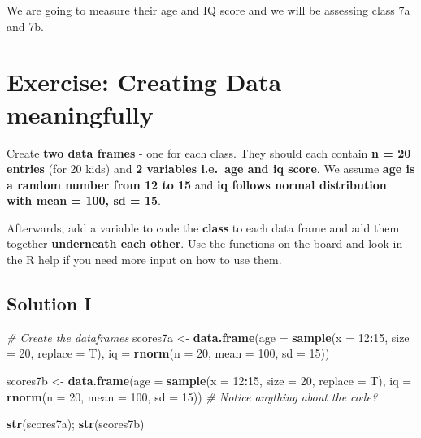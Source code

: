 \documentclass[
]{book}
\newenvironment{Shaded}{\begin{snugshade}}{\end{snugshade}}
\newcommand{\AttributeTok}[1]{\textcolor[rgb]{0.13,0.29,0.53}{#1}}
\newcommand{\CommentTok}[1]{\textcolor[rgb]{0.56,0.35,0.01}{\textit{#1}}}
\newcommand{\DecValTok}[1]{\textcolor[rgb]{0.00,0.00,0.81}{#1}}
\newcommand{\FunctionTok}[1]{\textcolor[rgb]{0.13,0.29,0.53}{\textbf{#1}}}
\newcommand{\NormalTok}[1]{#1}
\newcommand{\OtherTok}[1]{\textcolor[rgb]{0.56,0.35,0.01}{#1}}
\newcommand{\SpecialCharTok}[1]{\textcolor[rgb]{0.81,0.36,0.00}{\textbf{#1}}}
\begin{document}
We are going to measure their age and IQ score and we will be assessing class 7a and 7b.

\section{Exercise: Creating Data meaningfully}\label{exercise-creating-data-meaningfully}

Create \textbf{two data frames} - one for each class.
They should each contain \textbf{n = 20 entries} (for 20 kids) and \textbf{2 variables i.e.~age and iq score}.
We assume \textbf{age is a random number from 12 to 15} and \textbf{iq follows normal distribution with mean = 100, sd = 15}.

Afterwards, add a variable to code the \textbf{class} to each data frame and add them together \textbf{underneath each other}.
Use the functions on the board and look in the R help if you need more input on how to use them.

\subsection{Solution I}\label{solution-i}

\begin{Shaded}
\begin{Highlighting}[]
\CommentTok{\# Create the dataframes}
\NormalTok{scores7a }\OtherTok{\textless{}{-}} \FunctionTok{data.frame}\NormalTok{(}\AttributeTok{age =} \FunctionTok{sample}\NormalTok{(}\AttributeTok{x =} \DecValTok{12}\SpecialCharTok{:}\DecValTok{15}\NormalTok{, }\AttributeTok{size =} \DecValTok{20}\NormalTok{, }\AttributeTok{replace =}\NormalTok{ T),}
                       \AttributeTok{iq =} \FunctionTok{rnorm}\NormalTok{(}\AttributeTok{n =} \DecValTok{20}\NormalTok{, }\AttributeTok{mean =} \DecValTok{100}\NormalTok{, }\AttributeTok{sd =} \DecValTok{15}\NormalTok{))}

\NormalTok{scores7b }\OtherTok{\textless{}{-}} \FunctionTok{data.frame}\NormalTok{(}\AttributeTok{age =} \FunctionTok{sample}\NormalTok{(}\AttributeTok{x =} \DecValTok{12}\SpecialCharTok{:}\DecValTok{15}\NormalTok{, }\AttributeTok{size =} \DecValTok{20}\NormalTok{, }\AttributeTok{replace =}\NormalTok{ T),}
                       \AttributeTok{iq =} \FunctionTok{rnorm}\NormalTok{(}\AttributeTok{n =} \DecValTok{20}\NormalTok{, }\AttributeTok{mean =} \DecValTok{100}\NormalTok{, }\AttributeTok{sd =} \DecValTok{15}\NormalTok{))}
\CommentTok{\# Notice anything about the code?}

\FunctionTok{str}\NormalTok{(scores7a); }\FunctionTok{str}\NormalTok{(scores7b)}
\end{Highlighting}
\end{Shaded}
\end{document}
